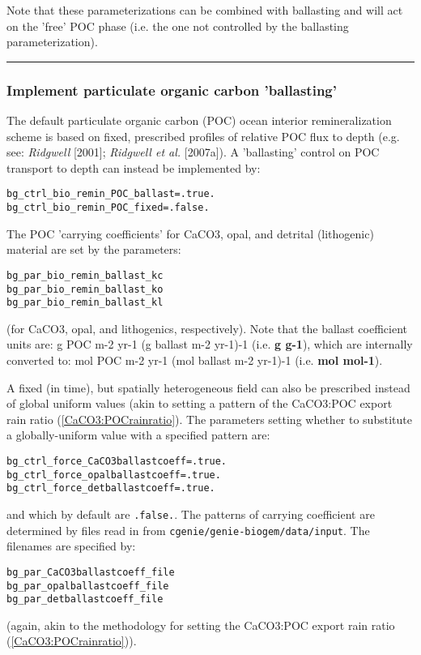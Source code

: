 \documentclass[11pt,fleqn]{book} %
\begin{document}
Note that these parameterizations can be combined with ballasting and will act on the 'free' POC phase (i.e. the one not controlled by the ballasting parameterization).

%
\noindent\rule{4cm}{0.5pt}
\subsubsection{Implement particulate organic carbon 'ballasting'}
\vspace{1mm}

The default particulate organic carbon (POC) ocean interior remineralization scheme is based on fixed, prescribed profiles of relative POC flux to depth (e.g. see: \textit{Ridgwell} [2001]; \textit{Ridgwell et al.} [2007a]). A 'ballasting' control on POC transport to depth can instead be implemented by:
\vspace{-2pt}\begin{verbatim}
bg_ctrl_bio_remin_POC_ballast=.true.
bg_ctrl_bio_remin_POC_fixed=.false.
\end{verbatim}\vspace{-2pt}

The POC 'carrying coefficients' for CaCO3, opal, and detrital (lithogenic) material are set by the parameters:
\vspace{-2pt}\begin{verbatim}
bg_par_bio_remin_ballast_kc
bg_par_bio_remin_ballast_ko
bg_par_bio_remin_ballast_kl
\end{verbatim}\vspace{-2pt}
(for CaCO3, opal, and lithogenics, respectively). Note that the ballast coefficient units are: g POC m-2 yr-1 (g ballast m-2 yr-1)-1 (i.e. \textbf{g g-1}), which are internally converted to: mol POC m-2 yr-1 (mol ballast m-2 yr-1)-1 (i.e. \textbf{mol mol-1}).

A fixed (in time), but spatially heterogeneous field can also be prescribed instead of global uniform values (akin to setting a pattern of the CaCO3:POC export rain ratio (\ref{CaCO3:POCrainratio}). The parameters setting whether to substitute a globally-uniform value with a specified pattern are:
\vspace{-2pt}\begin{verbatim}
bg_ctrl_force_CaCO3ballastcoeff=.true.
bg_ctrl_force_opalballastcoeff=.true.
bg_ctrl_force_detballastcoeff=.true.
\end{verbatim}\vspace{-2pt}
and which by default are \texttt{.false.}.
The patterns of carrying coefficient are determined by files read in from \texttt{cgenie\slash genie-biogem\slash data\slash input}. The filenames are specified by:
\vspace{-2pt}\begin{verbatim}
bg_par_CaCO3ballastcoeff_file
bg_par_opalballastcoeff_file
bg_par_detballastcoeff_file
\end{verbatim}\vspace{-2pt}
(again, akin to the methodology for setting the CaCO3:POC export rain ratio (\ref{CaCO3:POCrainratio})).
\end{document}
